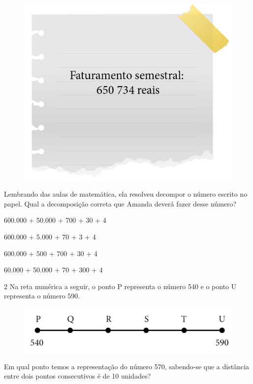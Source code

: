 \begin{figure}[htpb!]
\centering
\includegraphics[width=.8\textwidth]{../ilustracoes/MAT5/SAEB_5ANO_MAT_figura12.png}
\end{figure}

Lembrando das aulas de matemática, ela resolveu decompor o número escrito
no papel. Qual a decomposição correta que Amanda deverá fazer desse
número?

\begin{escolha}
\item
  600.000 + 50.000 + 700 + 30 + 4
\item
  600.000 + 5.000 + 70 + 3 + 4
\item
  600.000 + 500 + 700 + 30 + 4
\item
  60.000 + 50.000 + 70 + 300 + 4
\end{escolha}


\num{2} Na reta numérica a seguir, o ponto P representa o número 540 e o
ponto U representa o número 590.

\begin{figure}[htpb!]
\includegraphics[width=\textwidth]{../ilustracoes/MAT5/SAEB_5ANO_MAT_figura13.png}
\end{figure}

Em qual ponto temos a representação do número 570, sabendo-se que a
distância entre dois pontos consecutivos é de 10 unidades?


